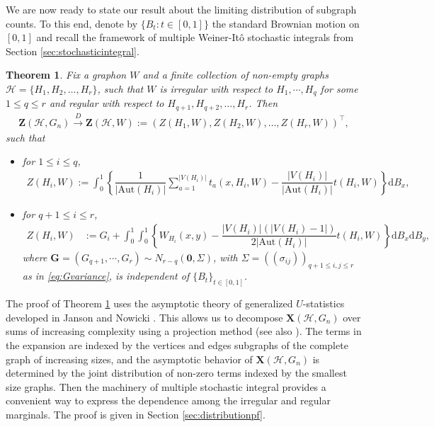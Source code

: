 \documentclass[11pt,reqno]{amsart}
\numberwithin{equation}{section}
\newcommand{\cH}{{\mathcal H}}
\newtheorem{theorem}{Theorem}[section]
\theoremstyle{definition}
\begin{document}
We are now ready to state our result about the limiting distribution of subgraph counts. To this end, denote by $\{B_{t}: t\in [0,1]\}$ the standard Brownian motion on $[0,1]$ and recall the framework of multiple Weiner-It\^{o} stochastic integrals from Section \ref{sec:stochasticintegral}. 



\begin{theorem}\label{thm:asymp-joint-dist}
Fix a graphon $W$ and a finite collection of non-empty graphs 
$\mathcal H = \{ H_1, H_2, \ldots, H_r \}$,
such that $W$ is irregular with respect to $H_{1},\cdots, H_{q}$ for some $1\leq q \leq r$ and regular with respect to $H_{q+1}, H_{q+2}, \ldots, H_r$. Then 
\begin{align}\label{eq:ZnHWlimit}
\bm Z(\mathcal H, G_n) \stackrel{D} \rightarrow  \bm{Z}\left(\mathcal H, W\right):=(Z(H_1, W), Z(H_2, W), \ldots, Z(H_r, W))^\top , 
\end{align}
such that 
\begin{itemize}


\item for $1\leq i\leq  q$,
\begin{align*}
  Z(H_i, W):= \int_{0}^{1} \left\{ \dfrac{1}{|\mathrm{Aut}(H_{i})|}\sum_{a=1}^{|V(H_{i})|}t_{a}(x,H_{i},W) - \dfrac{|V(H_{i})|}{|\mathrm{Aut}(H_{i})|}t(H_{i},W) \right\} \mathrm d B_{x} , 
\end{align*} 

\item for  $q+1 \leq i \leq r$,  
\begin{align*}
    Z(H_i, W)    & := G_{i}
    + \int_{0}^{1}\int_{0}^{1} \left\{ W_{H_{i}}(x,y) - \dfrac{|V(H_{i})|\left(|V(H_{i})-1|\right)}{2|\mathrm{Aut}(H_{i})|} t(H_{i},W) \right\} \mathrm d B_{x}\mathrm d B_{y} , 
\end{align*}
where $\bm G= \left(G_{q+1},\cdots, G_{r}\right)\sim N_{r-q} \left(\bm{0}, \Sigma\right)$, with $\Sigma = ((\sigma_{ij}))_{q+ 1 \leq i, j \leq r}$ as in \eqref{eq:Gvariance},  is independent of $\{B_{t}\}_{t\in [0,1]}$.

\end{itemize} 

\end{theorem}

The proof of Theorem \ref{thm:asymp-joint-dist} uses the asymptotic theory of generalized $U$-statistics developed in Janson and Nowicki \cite{janson1991asymptotic}. This allows us to decompose $\bm{X}(\cH, G_n)$ over sums of increasing complexity using a projection method (see also \cite[Chapter 11]{gaussianhilbert}). The terms in the expansion are indexed by the vertices and edges subgraphs of the complete graph of increasing sizes, and the asymptotic behavior of $\bm{X}(\cH, G_n)$ is determined by the joint distribution of non-zero terms indexed by the smallest size graphs. Then the machinery of multiple stochastic integral provides a convenient way to express the dependence among the irregular and regular marginals. The proof is given in Section \ref{sec:distributionpf}. 
\end{document}
